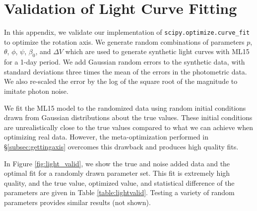 \documentclass[twocolumn,doublespacing]{aastex631}
\begin{document}
{}


\appendix

\section{Validation of Light Curve Fitting}\label{sec:lightfitvalid}

In this appendix, we validate our implementation of \texttt{scipy.optimize.curve\_fit} to optimize the rotation axis. We generate random combinations of parameters $p$, $\theta$, $\phi$, $\psi$, $\beta_0$, and $\Delta V$ which are used to generate synthetic light curves with ML15 for a 1-day period. We add Gaussian random errors to the synthetic data, with standard deviations three times the mean of the errors in the photometric data. We also re-scaled the error by the log of the square root of the magnitude to imitate photon noise.

We fit the ML15 model to the randomized data using random initial conditions drawn from Gaussian distributions about the true values. These initial conditions are unrealistically close to the true values compared to what we can achieve when optimizing real data. However, the meta-optimization performed in \S\ref{subsec:gettingaxis} overcomes this drawback and produces high quality fits.

In Figure \ref{fig:light_valid}, we show the true and noise added data and the optimal fit for a randomly drawn parameter set. This fit is extremely high quality, and the true value, optimized value, and statistical difference of the parameters are given in Table \ref{table:lightvalid}. Testing a variety of random parameters provides similar results (not shown). 
\end{document}
